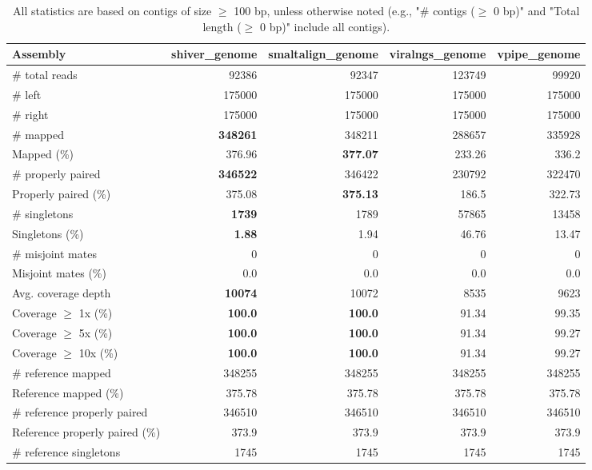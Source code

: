 \documentclass[12pt,a4paper]{article}
\begin{document}
\begin{table}[ht]
\begin{center}
\caption{All statistics are based on contigs of size $\geq$ 100 bp, unless otherwise noted (e.g., "\# contigs ($\geq$ 0 bp)" and "Total length ($\geq$ 0 bp)" include all contigs).}
\begin{tabular}{|l*{4}{|r}|}
\hline
Assembly & shiver\_genome & smaltalign\_genome & viralngs\_genome & vpipe\_genome \\ \hline
\# total reads & 92386 & 92347 & 123749 & 99920 \\ \hline
\# left & 175000 & 175000 & 175000 & 175000 \\ \hline
\# right & 175000 & 175000 & 175000 & 175000 \\ \hline
\# mapped & {\bf 348261} & 348211 & 288657 & 335928 \\ \hline
Mapped (\%) & 376.96 & {\bf 377.07} & 233.26 & 336.2 \\ \hline
\# properly paired & {\bf 346522} & 346422 & 230792 & 322470 \\ \hline
Properly paired (\%) & 375.08 & {\bf 375.13} & 186.5 & 322.73 \\ \hline
\# singletons & {\bf 1739} & 1789 & 57865 & 13458 \\ \hline
Singletons (\%) & {\bf 1.88} & 1.94 & 46.76 & 13.47 \\ \hline
\# misjoint mates & 0 & 0 & 0 & 0 \\ \hline
Misjoint mates (\%) & 0.0 & 0.0 & 0.0 & 0.0 \\ \hline
Avg. coverage depth & {\bf 10074} & 10072 & 8535 & 9623 \\ \hline
Coverage $\geq$ 1x (\%) & {\bf 100.0} & {\bf 100.0} & 91.34 & 99.35 \\ \hline
Coverage $\geq$ 5x (\%) & {\bf 100.0} & {\bf 100.0} & 91.34 & 99.27 \\ \hline
Coverage $\geq$ 10x (\%) & {\bf 100.0} & {\bf 100.0} & 91.34 & 99.27 \\ \hline
\# reference mapped & 348255 & 348255 & 348255 & 348255 \\ \hline
Reference mapped (\%) & 375.78 & 375.78 & 375.78 & 375.78 \\ \hline
\# reference properly paired & 346510 & 346510 & 346510 & 346510 \\ \hline
Reference properly paired (\%) & 373.9 & 373.9 & 373.9 & 373.9 \\ \hline
\# reference singletons & 1745 & 1745 & 1745 & 1745 \\ \hline

\end{tabular}
\end{center}
\end{table}
\end{document}
